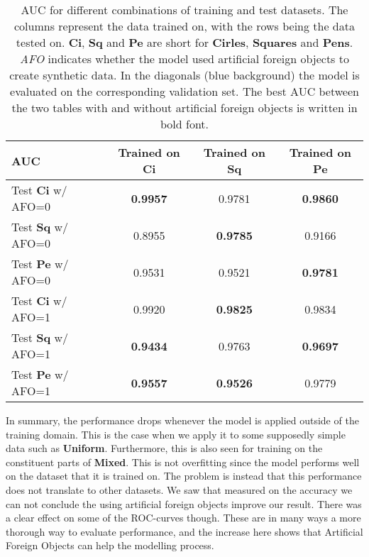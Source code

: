 \begin{table}
\begin{tabular}{l|ccc}
	\hline
	AUC	& Trained on \textbf{Ci} &   Trained on \textbf{Sq} &   Trained on \textbf{Pe} \\
	\hline
	Test \textbf{Ci} w/ AFO=0 & \cellcolor{pblue!25} \textbf{0.9957} &        0.9781 &        \textbf{0.9860} \\
	Test \textbf{Sq} w/ AFO=0 & 0.8955 &        \cellcolor{pblue!25} \textbf{0.9785} &        0.9166 \\
	Test \textbf{Pe} w/ AFO=0 & 0.9531 &        0.9521 &        \cellcolor{pblue!25} \textbf{0.9781} \\
	\hline
	Test \textbf{Ci} w/ AFO=1 & \cellcolor{pblue!25} 0.9920 &        \textbf{0.9825} &        0.9834 \\
	Test \textbf{Sq} w/ AFO=1 & \textbf{0.9434} &        \cellcolor{pblue!25} 0.9763 &        \textbf{0.9697} \\
	Test \textbf{Pe} w/ AFO=1 & \textbf{0.9557} &        \textbf{0.9526} &        \cellcolor{pblue!25} 0.9779 \\
	\hline
\end{tabular}
\caption{
\ac{AUC} for different combinations of training and test datasets. The columns represent the data trained on, with the rows being the data tested on. \textbf{Ci}, \textbf{Sq} and \textbf{Pe} are short for \textbf{Cirles}, \textbf{Squares} and \textbf{Pens}.
\textit{AFO} indicates whether the model used artificial foreign objects to create synthetic data. 
In the diagonals (blue background) the model is evaluated on the corresponding validation set. 
The best \ac{AUC} between the two tables with and without artificial foreign objects is written in bold font.	
}
\label{tab:afoauc}
\end{table}

In summary, the performance drops whenever the model is applied outside of the training domain.
This is the case when we apply it to some supposedly simple data such as \textbf{Uniform}.
Furthermore, this is also seen for training on the constituent parts of \textbf{Mixed}. This is not overfitting since the model performs well on the dataset that it is trained on.
The problem is instead that this performance does not translate to other datasets.
We saw that measured on the accuracy we can not conclude the using artificial foreign objects improve our result.
There was a clear effect on some of the \acp{ROC-curve} though.
These are in many ways a more thorough way to evaluate performance, and the increase here shows that Artificial Foreign Objects can help the modelling process.